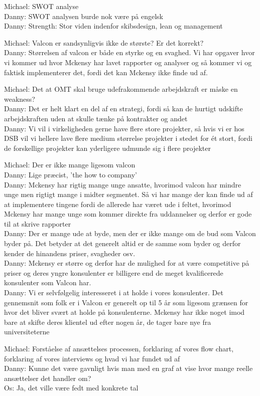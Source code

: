Michael: SWOT analyse\\
Danny: SWOT analysen burde nok være på engelsk\\
Danny: Strength: Stor viden indenfor skibsdesign, lean og management

Michael: Valcon er sandsynligvis ikke de største? Er det korrekt?\\
Danny: Størrelsen af valcon er både en styrke og en svaghed. Vi har opgaver hvor vi kommer ud hvor Mckensy har lavet rapporter og analyser og så kommer vi og faktisk implementerer det, fordi det kan Mckensy ikke finde ud af.

Michael: Det at OMT skal bruge udefrakommende arbejdskraft er måske en weakness?\\
Danny: Det er helt klart en del af en strategi, fordi så kan de hurtigt udskifte arbejdskraften uden at skulle tænke på kontrakter og andet\\
Danny: Vi vil i virkeligheden gerne have flere store projekter, så hvis vi er hos DSB vil vi hellere lave flere medium størrelse projekter i stedet for ét stort, fordi de forskellige projekter kan yderligere udmunde sig i flere projekter

Michael: Der er ikke mange ligesom valcon\\
Danny: Lige præcist, 'the how to company'\\
Danny: Mckensy har rigtig mange unge ansatte, hvorimod valcon har mindre unge men rigtigt mange i midter segmentet. Så vi har mange der kan finde ud af at implementere tingene fordi de allerede har været ude i feltet, hvorimod Mckensy har mange unge som kommer direkte fra uddannelser og derfor er gode til at skrive rapporter\\
Danny: Der er mange ude at byde, men der er ikke mange om de bud som Valcon byder på. Det betyder at det generelt altid er de samme som byder og derfor kender de hinandens priser, svagheder osv.\\
Danny: Mckensy er større og derfor har de mulighed for at være competitive på priser og deres yngre konsulenter er billigere end de meget kvalificerede konsulenter som Valcon har.\\
Danny: Vi er selvfølgelig interesseret i at holde i vores konsulenter. Det gennemsnit som folk er i Valcon er generelt op til 5 år som ligesom grænsen for hvor det bliver svært at holde på konsulenterne. Mckensy har ikke noget imod bare at skifte deres klientel ud efter nogen år, de tager bare nye fra universiteterne

Michael: Forståelse af ansættelses processen, forklaring af vores flow chart, forklaring af vores interviews og hvad vi har fundet ud af\\
Danny: Kunne det være gavnligt hvis man med en graf at vise hvor mange reelle ansættelser det handler om?\\
Os: Ja, det ville være fedt med konkrete tal

